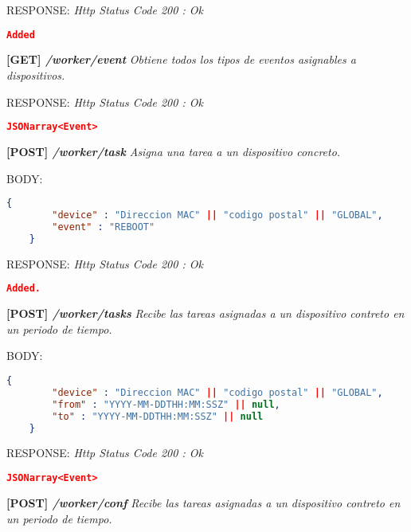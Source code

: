     RESPONSE: \newline
    \textit{Http Status Code 200 : Ok}
    \begin{lstlisting}[language=json,firstnumber=1]
    Added
    \end{lstlisting}
\hline \newline
\textbf{[GET] \textit{/worker/event }}
\textit{Obtiene todos los tipos de eventos asignables a dispositivos.}

    RESPONSE: \newline
    \textit{Http Status Code 200 : Ok}
    \begin{lstlisting}[language=json,firstnumber=1]
    JSONarray<Event>
    \end{lstlisting}
\hline \newline
\textbf{[POST] \textit{/worker/task }}
\textit{Asigna una tarea a un dispositivo concreto.}

    BODY:
   \begin{lstlisting}[language=json,firstnumber=1]
    {
        "device" : "Direccion MAC" || "codigo postal" || "GLOBAL",
        "event" : "REBOOT"
    }
    \end{lstlisting} 
    
    RESPONSE: \newline
    \textit{Http Status Code 200 : Ok}
    \begin{lstlisting}[language=json,firstnumber=1]
    Added.
    \end{lstlisting}
\hline \newline

\newpage
\textbf{[POST] \textit{/worker/tasks }}
\textit{Recibe las tareas asignadas a un dispositivo contreto en un periodo de tiempo.}

    BODY:
   \begin{lstlisting}[language=json,firstnumber=1]
    {
        "device" : "Direccion MAC" || "codigo postal" || "GLOBAL",
        "from" : "YYYY-MM-DDTHH:MM:SSZ" || null,
        "to" : "YYYY-MM-DDTHH:MM:SSZ" || null
    }
    \end{lstlisting} 
    
    RESPONSE: \newline
    \textit{Http Status Code 200 : Ok}
    \begin{lstlisting}[language=json,firstnumber=1]
    JSONarray<Event>
    \end{lstlisting}
\hline \newline

\textbf{[POST] \textit{/worker/conf }}
\textit{Recibe las tareas asignadas a un dispositivo contreto en un periodo de tiempo.}

